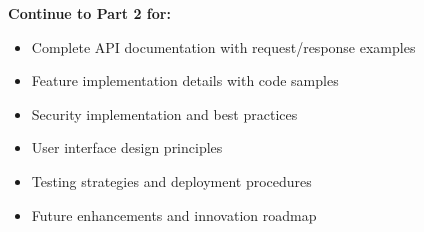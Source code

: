 \documentclass[12pt,a4paper]{article}
\begin{document}
\vspace{0.5cm}

\textbf{Continue to Part 2 for:}
\begin{itemize}
    \item Complete API documentation with request/response examples
    \item Feature implementation details with code samples
    \item Security implementation and best practices
    \item User interface design principles
    \item Testing strategies and deployment procedures
    \item Future enhancements and innovation roadmap
\end{itemize}
\end{document}
